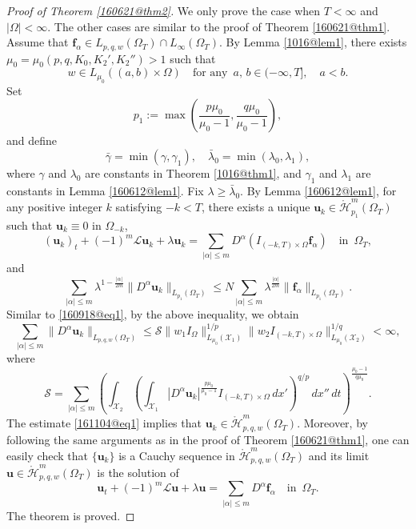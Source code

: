 \documentclass[reqno]{amsart}
\numberwithin{equation}{section}
\theoremstyle{plain}
\theoremstyle{definition}
\theoremstyle{remark}
\begin{document}
\begin{proof}[Proof of Theorem \ref{160621@thm2}]
We only prove the case when $T<\infty$ and $|\Omega|<\infty$.
The other cases are similar to the proof of Theorem \ref{160621@thm1}.
Assume that ${\boldsymbol{f}}_\alpha\in L_{p,q,w}(\Omega_T)\cap L_\infty(\Omega_T)$.
By Lemma \ref{1016@lem1}, there exists $\mu_0=\mu_0(p,q,K_0,K_2',K_2'')>1$ such that 
$$
w \in L_{\mu_0}((a,b)\times \Omega) \quad \text{for any }\, a,\,b\in (-\infty,T],\quad a<b.
$$
Set
$$
p_1:=\max\left(\frac{p\mu_0}{\mu_0-1}, \frac{q\mu_0}{\mu_0-1}\right),
$$
and define
$$
\bar{\gamma}=\min(\gamma,\gamma_1), \quad  \bar{\lambda}_0=\min(\lambda_0,\lambda_1),
$$
where $\gamma$ and $\lambda_0$ are constants in Theorem \ref{1016@thm1}, and $\gamma_1$ and $\lambda_1$ are constants in Lemma \ref{160612@lem1}.
Fix $\lambda\ge \bar{\lambda}_0$.
By Lemma \ref{160612@lem1}, for any positive integer $k$ satisfying $-k<T$, there exists a unique ${\boldsymbol{u}}_k\in \mathring{\mathcal{H}}^m_{p_1}(\Omega_T)$ such that  ${\boldsymbol{u}}_k\equiv 0$ in $\Omega_{-k}$,
$$
({\boldsymbol{u}}_k)_t+(-1)^m{\mathcal{L}}{\boldsymbol{u}}_k+\lambda{\boldsymbol{u}}_k=\sum_{|\alpha| \le m}D^\alpha (I_{(-k,T)\times \Omega}{\boldsymbol{f}}_\alpha) \quad \text{in }\,  \Omega_T,
$$
and 
$$
\sum_{|\alpha|\le m}\lambda^{1-\frac{|\alpha|}{2m}}\|D^\alpha {\boldsymbol{u}}_k\|_{L_{p_1}(\Omega_T)}\le N\sum_{|\alpha|\le m}\lambda^{\frac{|\alpha|}{2m}}\|{\boldsymbol{f}}_\alpha\|_{L_{p_1}(\Omega_T)}.
$$
Similar to \eqref{160918@eq1}, by the above inequality, we obtain
\begin{equation}		\label{161104@eq1}
\sum_{|\alpha|\le m}\|D^\alpha {\boldsymbol{u}}_k\|_{L_{p,q,w}(\Omega_T)}\le  {\mathcal{S}}\|w_1I_{\Omega}\|_{L_{\mu_0}({\mathcal{X}}_1)}^{1/p} \|w_2I_{(-k,T)\times \Omega}\|_{L_{\mu_0}({\mathcal{X}}_2)}^{1/q}<\infty,
\end{equation}
where 
$$
{\mathcal{S}}=\sum_{|\alpha|\le m}\left(\int_{{\mathcal{X}}_2}\left(\int_{{\mathcal{X}}_1}|D^\alpha {\boldsymbol{u}}_k|^{\frac{p\mu_0}{\mu_0-1}}I_{(-k,T)\times \Omega}\,dx'\right)^{q/p}\,dx''\,dt\right)^{\frac{\mu_0-1}{q\mu_0}}.
$$
The estimate \eqref{161104@eq1} implies that  ${\boldsymbol{u}}_k\in \mathring{\mathcal{H}}^m_{p,q,w}(\Omega_T)$.
Moreover, by following the same arguments as in the proof of Theorem \ref{160621@thm1}, one can easily check that $\{{\boldsymbol{u}}_k\}$ is a Cauchy sequence in $\mathring{\mathcal{H}}^m_{p,q,w}(\Omega_T)$ and its limit ${\boldsymbol{u}}\in \mathring{\mathcal{H}}^m_{p,q,w}(\Omega_T)$ is the solution of 
$$
{\boldsymbol{u}}_t+(-1)^m{\mathcal{L}}{\boldsymbol{u}}+\lambda {\boldsymbol{u}}=\sum_{|\alpha|\le m}D^\alpha {\boldsymbol{f}}_\alpha \quad \text{in }\, \Omega_T.
$$
The theorem is proved.
\end{proof}
\end{document}
